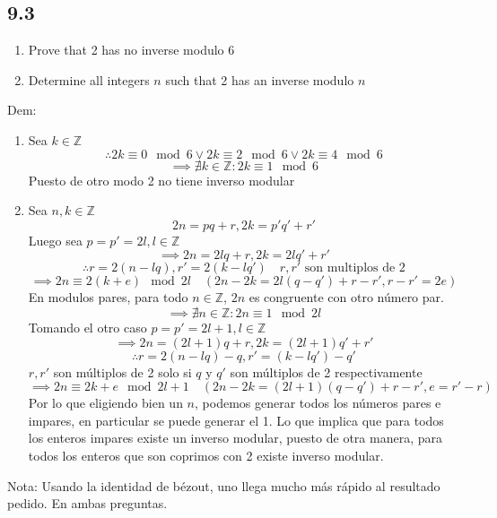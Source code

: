 \documentclass[11pt]{article}
\begin{document}
\subsection*{9.3}
\begin{enumerate}[label=(\alph*)]
	\item Prove that 2 has no inverse modulo 6
	
	\item Determine all integers $n$ such that 2 has an inverse modulo $n$
\end{enumerate}
Dem:
\begin{enumerate}[label=(\alph*)]
	\item  Sea $k\in\mathbb{Z}$
	\[
	\therefore 2k\equiv 0 \mod 6\vee 2k\equiv 2 \mod 6\vee 2k\equiv 4 \mod 6
	\]
	\[
	\implies \nexists k\in\mathbb{Z}: 2k\equiv 1 \mod 6
	\]
	Puesto de otro modo 2 no tiene inverso modular
	\item Sea $n,k\in\mathbb{Z}$
	\[
	2n=pq+r, 2k=p'q'+r'
	\]
	Luego sea $p=p'=2l,l\in\mathbb{Z}$
	\[
	\implies 2n=2lq+r,2k=2lq'+r'
	\]
	\[
	\therefore r=2(n-lq),r'=2(k-lq')\quad\textrm{$r,r'$ son multiplos de 2}
	\]
	\[
	\implies 2n\equiv 2(k+e) \mod 2l\quad\left(2n-2k=2l(q-q')+r-r',r-r'=2e\right)
	\]
	En modulos pares, para todo $n\in\mathbb{Z}$, $2n$ es congruente con otro número par.
	\[
	\implies \nexists n\in\mathbb{Z}:2n\equiv 1 \mod 2l
	\]
	Tomando el otro caso $p=p'=2l+1,l\in\mathbb{Z}$
	\[
	\implies 2n=(2l+1)q+r,2k=(2l+1)q'+r'
	\]
	\[
	\therefore r=2(n-lq)-q, r'=(k-lq')-q' 
	\]
	$r,r'$ son múltiplos de 2 solo si $q$ y $q'$ son múltiplos de 2 respectivamente
	\[
	\implies 2n\equiv 2k+e \mod 2l+1\quad \left(2n-2k=(2l+1)(q-q')+r-r',e=r'-r\right)
	\]
	Por lo que eligiendo bien un $n$, podemos generar todos los números pares e impares, en particular se puede generar el 1. Lo que implica que para todos los enteros impares existe un inverso modular, puesto de otra manera, para todos los enteros que son coprimos con 2 existe inverso modular.
\end{enumerate}
Nota: Usando la identidad de bézout, uno llega mucho más rápido al resultado pedido. En ambas preguntas.
\end{document}
